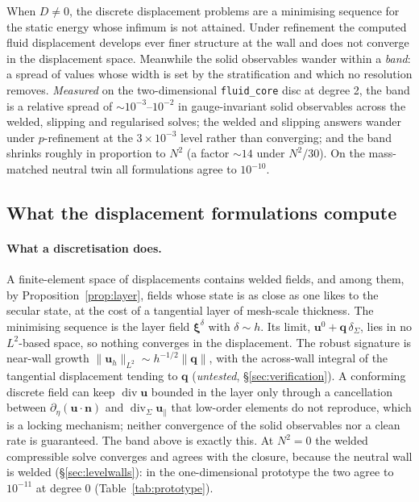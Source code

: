 \documentclass[11pt]{article}
\theoremstyle{definition}
\theoremstyle{remark}
\newcommand{\bu}{\mathbf{u}}
\newcommand{\bn}{\mathbf{n}}
\newcommand{\bq}{\mathbf{q}}
\newcommand{\bxi}{\boldsymbol{\xi}}
\newcommand{\Div}{\operatorname{div}}
\newcommand{\divS}{\operatorname{div}_\Sigma}
\newcommand{\code}[1]{\texttt{#1}}
\begin{document}
When $D \ne 0$, the discrete displacement problems are a minimising
sequence for the static energy whose infimum is not attained. Under
refinement the computed fluid displacement develops ever finer
structure at the wall and does not converge in the displacement space.
Meanwhile the solid observables wander within a \emph{band}: a spread
of values whose width is set by the stratification and which no
resolution removes. \emph{Measured} on the two-dimensional
\code{fluid\_core} disc at degree 2, the band is a relative spread of
$\sim 10^{-3}$--$10^{-2}$ in gauge-invariant solid observables across
the welded, slipping and regularised solves; the welded and slipping
answers wander under $p$-refinement at the $3\times10^{-3}$ level
rather than converging; and the band shrinks roughly in proportion to
$N^2$ (a factor $\sim 14$ under $N^2/30$). On the mass-matched neutral
twin all formulations agree to $10^{-10}$.

\subsection{What the displacement formulations compute}

\paragraph{What a discretisation does.} A finite-element space of
displacements contains welded fields, and among them, by
Proposition~\ref{prop:layer}, fields whose state is as close as one
likes to the secular state, at the cost of a tangential layer of
mesh-scale thickness. The minimising sequence is the layer field
$\bxi^\delta$ with $\delta \sim h$. Its limit, $\bu^0 +
\bq\,\delta_\Sigma$, lies in no $L^2$-based space, so nothing converges
in the displacement. The robust signature is near-wall growth
$\|\bu_h\|_{L^2} \sim h^{-1/2}\|\bq\|$, with the across-wall integral of
the tangential displacement tending to $\bq$ (\emph{untested},
\S\ref{sec:verification}). A conforming discrete field can keep
$\Div\bu$ bounded in the layer only through a cancellation between
$\partial_\eta(\bu\cdot\bn)$ and $\divS\bu_\parallel$ that low-order
elements do not reproduce, which is a locking mechanism; neither
convergence of the solid observables nor a clean rate is guaranteed.
The band above is exactly this. At $N^2 = 0$ the welded compressible
solve converges and agrees with the closure, because the neutral wall
is welded (\S\ref{sec:levelwalls}): in the one-dimensional prototype the
two agree to $10^{-11}$ at degree 0 (Table~\ref{tab:prototype}).
\end{document}
